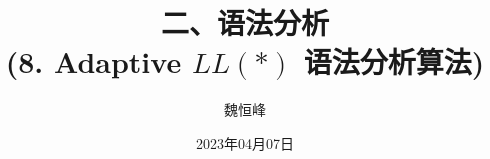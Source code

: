 \documentclass[handout]{beamer}
\title[语法分析]{二、语法分析 \\ (8. Adaptive $LL(\ast)$ 语法分析算法)}
\author[魏恒峰]{\large 魏恒峰}
\institute{hfwei@nju.edu.cn}
\date{2023年04月07日}
\begin{document}
\maketitle






\thankyou{}

\end{document}

